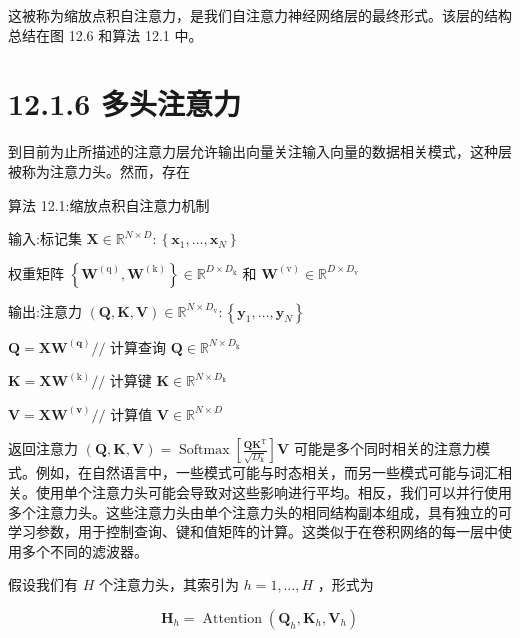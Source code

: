 \documentclass[10pt]{article}
\begin{document}
这被称为缩放点积自注意力，是我们自注意力神经网络层的最终形式。该层的结构总结在图 12.6 和算法 12.1 中。

\section*{12.1.6 多头注意力}

到目前为止所描述的注意力层允许输出向量关注输入向量的数据相关模式，这种层被称为注意力头。然而，存在

算法 12.1:缩放点积自注意力机制

输入:标记集 \(\mathbf{X} \in  {\mathbb{R}}^{N \times  D} : \left\{  {{\mathbf{x}}_{1},\ldots ,{\mathbf{x}}_{N}}\right\}\)

权重矩阵 \(\left\{  {{\mathbf{W}}^{\left( \mathrm{q}\right) },{\mathbf{W}}^{\left( \mathrm{k}\right) }}\right\}   \in  {\mathbb{R}}^{D \times  {D}_{\mathrm{k}}}\) 和 \({\mathbf{W}}^{\left( \mathrm{v}\right) } \in  {\mathbb{R}}^{D \times  {D}_{\mathrm{v}}}\)

输出:注意力 \(\left( {\mathbf{Q},\mathbf{K},\mathbf{V}}\right)  \in  {\mathbb{R}}^{N \times  {D}_{\mathrm{v}}} : \left\{  {{\mathbf{y}}_{1},\ldots ,{\mathbf{y}}_{N}}\right\}\)

\(\mathbf{Q} = \mathbf{X}{\mathbf{W}}^{\left( \mathbf{q}\right) }//\) 计算查询 \(\mathbf{Q} \in  {\mathbb{R}}^{N \times  {D}_{\mathrm{k}}}\)

\(\mathbf{K} = \mathbf{X}{\mathbf{W}}^{\left( \mathrm{k}\right) }//\) 计算键 \(\mathbf{K} \in  {\mathbb{R}}^{N \times  {D}_{\mathrm{k}}}\)

\(\mathbf{V} = \mathbf{X}{\mathbf{W}}^{\left( \mathbf{v}\right) }//\) 计算值 \(\mathbf{V} \in  {\mathbb{R}}^{N \times  D}\)

返回注意力 \(\left( {\mathbf{Q},\mathbf{K},\mathbf{V}}\right)  = \operatorname{Softmax}\left\lbrack  \frac{{\mathbf{{QK}}}^{\mathrm{T}}}{\sqrt{{D}_{\mathrm{k}}}}\right\rbrack  \mathbf{V}\) 可能是多个同时相关的注意力模式。例如，在自然语言中，一些模式可能与时态相关，而另一些模式可能与词汇相关。使用单个注意力头可能会导致对这些影响进行平均。相反，我们可以并行使用多个注意力头。这些注意力头由单个注意力头的相同结构副本组成，具有独立的可学习参数，用于控制查询、键和值矩阵的计算。这类似于在卷积网络的每一层中使用多个不同的滤波器。

假设我们有 \(H\) 个注意力头，其索引为 \(h = 1,\ldots ,H\) ，形式为

\[
{\mathbf{H}}_{h} = \operatorname{Attention}\left( {{\mathbf{Q}}_{h},{\mathbf{K}}_{h},{\mathbf{V}}_{h}}\right)  \tag{12.15}
\]
\end{document}
